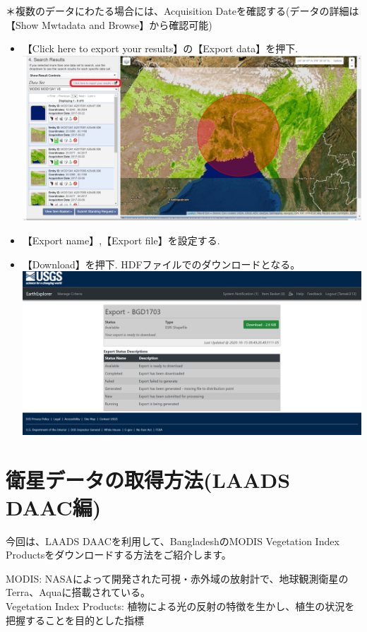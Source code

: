 \documentclass[
]{book}
\begin{document}
＊複数のデータにわたる場合には、Acquisition Dateを確認する(データの詳細は【Show Mwtadata and Browse】から確認可能)

\begin{itemize}
\item
  【Click here to export your results】の【Export data】を押下.\\
  \includegraphics{images/download.png}
\item
  【Export name】,【Export file】を設定する.
\item
  【Download】を押下. HDFファイルでのダウンロードとなる。
  \includegraphics{images/last.png}
\end{itemize}

\hypertarget{ux885bux661fux30c7ux30fcux30bfux306eux53d6ux5f97ux65b9ux6cd5laads-daacux7de8}{%
\chapter{衛星データの取得方法(LAADS DAAC編)}\label{ux885bux661fux30c7ux30fcux30bfux306eux53d6ux5f97ux65b9ux6cd5laads-daacux7de8}}

今回は、LAADS DAACを利用して、BangladeshのMODIS Vegetation Index Productsをダウンロードする方法をご紹介します。

MODIS: NASAによって開発された可視・赤外域の放射計で、地球観測衛星のTerra、Aquaに搭載されている。\\
Vegetation Index Products: 植物による光の反射の特徴を生かし、植生の状況を把握することを目的とした指標
\end{document}
